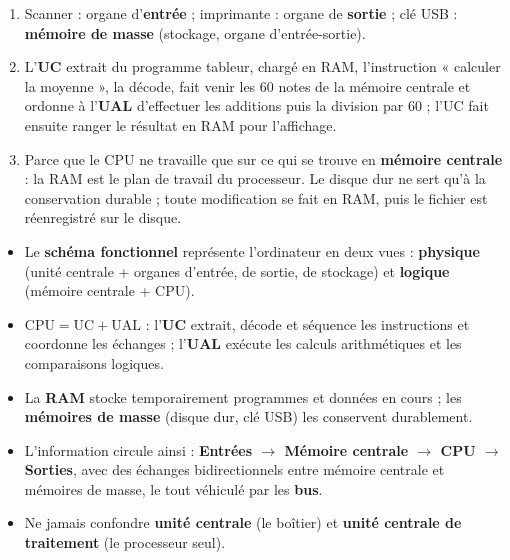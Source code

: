 \documentclass[11pt]{article}
\begin{document}
\begin{corrige}[Exercice]
\begin{enumerate}
\item Scanner : organe d'\textbf{entrée} ; imprimante : organe de \textbf{sortie} ; clé USB : \textbf{mémoire de masse} (stockage, organe d'entrée-sortie).
\item L'\textbf{UC} extrait du programme tableur, chargé en RAM, l'instruction « calculer la moyenne », la décode, fait venir les 60 notes de la mémoire centrale et ordonne à l'\textbf{UAL} d'effectuer les additions puis la division par 60 ; l'UC fait ensuite ranger le résultat en RAM pour l'affichage.
\item Parce que le CPU ne travaille que sur ce qui se trouve en \textbf{mémoire centrale} : la RAM est le plan de travail du processeur. Le disque dur ne sert qu'à la conservation durable ; toute modification se fait en RAM, puis le fichier est réenregistré sur le disque.
\end{enumerate}
\end{corrige}

\begin{aretenir}
\begin{itemize}
\item Le \textbf{schéma fonctionnel} représente l'ordinateur en deux vues : \textbf{physique} (unité centrale + organes d'entrée, de sortie, de stockage) et \textbf{logique} (mémoire centrale + CPU).
\item $\text{CPU} = \text{UC} + \text{UAL}$ : l'\textbf{UC} extrait, décode et séquence les instructions et coordonne les échanges ; l'\textbf{UAL} exécute les calculs arithmétiques et les comparaisons logiques.
\item La \textbf{RAM} stocke temporairement programmes et données en cours ; les \textbf{mémoires de masse} (disque dur, clé USB) les conservent durablement.
\item L'information circule ainsi : \textbf{Entrées $\rightarrow$ Mémoire centrale $\rightarrow$ CPU $\rightarrow$ Sorties}, avec des échanges bidirectionnels entre mémoire centrale et mémoires de masse, le tout véhiculé par les \textbf{bus}.
\item Ne jamais confondre \textbf{unité centrale} (le boîtier) et \textbf{unité centrale de traitement} (le processeur seul).
\end{itemize}
\end{aretenir}

\newpage
\end{document}
